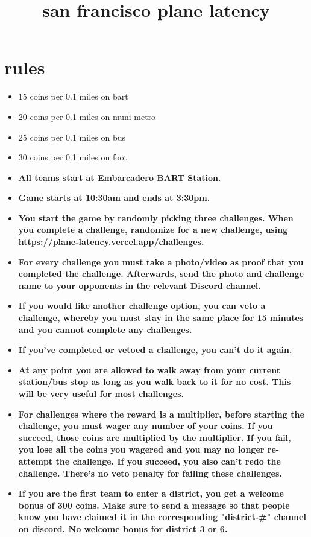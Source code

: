 \documentclass{article}
\title{san francisco plane latency}
\author{}
\date{}
\begin{document}
\maketitle

\section{rules}
\begin{itemize}
    \item 15 coins per 0.1 miles on bart
    \item 20 coins per 0.1 miles on muni metro
    \item 25 coins per 0.1 miles on bus
    \item 30 coins per 0.1 miles on foot
    \item \textbf{All teams start at Embarcadero BART Station.}
    \item \textbf{Game starts at 10:30am and ends at 3:30pm.}
    \item \textbf{You start the game by randomly picking three challenges. When you complete a challenge, randomize for a new challenge, using \url{https://plane-latency.vercel.app/challenges}.}
    \item \textbf{For every challenge you must take a photo/video as proof that you completed the challenge. Afterwards, send the photo and challenge name to your opponents in the relevant Discord channel.}
    \item \textbf{If you would like another challenge option, you can veto a challenge, whereby you must stay in the same place for 15 minutes and you cannot complete any challenges.}
    \item \textbf{If you've completed or vetoed a challenge, you can't do it again. }
    \item \textbf{At any point you are allowed to walk away from your current station/bus stop as long as you walk back to it for no cost. This will be very useful for most challenges.}
    \item \textbf{For challenges where the reward is a multiplier, before starting the challenge, you must wager any number of your coins. If you succeed, those coins are multiplied by the multiplier. If you fail, you lose all the coins you wagered and you may no longer re-attempt the challenge. If you succeed, you also can't redo the challenge. There's no veto penalty for failing these challenges.}
    \item \textbf{If you are the first team to enter a district, you get a welcome bonus of 300 coins. Make sure to send a message so that people know you have claimed it in the corresponding "district-\#" channel on discord. No welcome bonus for district 3 or 6.}

\end{itemize}
\end{document}
